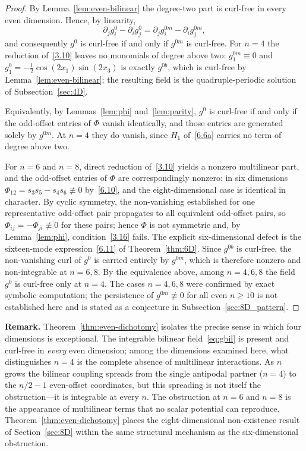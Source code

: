 \documentclass[11pt]{jfm}
\numberwithin{equation}{section}
\begin{document}
\begin{proof}
By Lemma~\ref{lem:even-bilinear} the degree-two part is curl-free in every even dimension.
Hence, by linearity,
\[
\partial_j g_i^0-\partial_i g_j^0=\partial_j g_i^{0m}-\partial_i g_j^{0m},
\]
and consequently $g^0$ is curl-free if and only if $g^{0m}$ is curl-free.
For $n=4$ the reduction of~\eqref{3.10} leaves no monomials of degree above two:
$g_1^{0m}\equiv 0$ and $g_1^0 = -\tfrac12\cos(2x_1)\sin(2x_3)$ is exactly
$g^{0b}$, which is curl-free by Lemma~\ref{lem:even-bilinear}; the resulting field
is the quadruple-periodic solution of Subsection~\ref{sec:4D}.

Equivalently, by Lemmas~\ref{lem:phi} and~\ref{lem:parity}, $g^0$ is curl-free if and only if
the odd-offset entries of $\Phi$ vanish identically, and those entries are generated solely by
$g^{0m}$. At $n=4$ they do vanish, since $H_1$ of~\eqref{6.6a} carries no term of degree
above two.

For $n=6$ and $n=8$, direct reduction of~\eqref{3.10} yields a nonzero multilinear part, and
the odd-offset entries of $\Phi$ are correspondingly nonzero: in six dimensions
$\Phi_{12}=s_3s_5-s_4s_6\not\equiv0$ by~\eqref{6.10}, and the eight-dimensional case is
identical in character. By cyclic symmetry, the non-vanishing established for one representative odd-offset pair propagates to all equivalent odd-offset pairs, so $\Phi_{ij}=-\Phi_{ji}\not\equiv0$ for these pairs; hence $\Phi$ is not symmetric and, by Lemma~\ref{lem:phi}, condition~\eqref{3.16} fails. The
explicit six-dimensional defect is the sixteen-mode expression~\eqref{6.11} of
Theorem~\ref{thm:6D}. Since $g^{0b}$ is curl-free, the non-vanishing curl of $g^0$
is carried entirely by $g^{0m}$, which is therefore nonzero and non-integrable at $n=6,8$.
By the equivalence above, among $n=4,6,8$ the field $g^0$ is
curl-free only at $n=4$. The cases $n=4,6,8$ were confirmed by exact symbolic computation;
the persistence of $g^{0m}\not\equiv0$ for all even $n\geq10$ is not established
here and is stated as a conjecture in Subsection~\ref{sec:8D_pattern}.
\end{proof}

\noindent\textbf{Remark.} Theorem~\ref{thm:even-dichotomy} isolates the precise sense in which
four dimensions is exceptional. The integrable bilinear field~\eqref{eq:gbil} is present and
curl-free in \emph{every} even dimension; among the dimensions examined here, what distinguishes $n=4$ is the complete absence of multilinear interactions. As $n$ grows the bilinear coupling spreads from the single
antipodal partner ($n=4$) to the $n/2-1$ even-offset coordinates, but this spreading is not
itself the obstruction---it is integrable at every $n$. The obstruction at $n=6$ and $n=8$ is the appearance
of multilinear terms that no scalar potential can reproduce. Theorem~\ref{thm:even-dichotomy}
places the eight-dimensional non-existence result of Section~\ref{sec:8D} within the same
structural mechanism as the six-dimensional obstruction.
\end{document}
